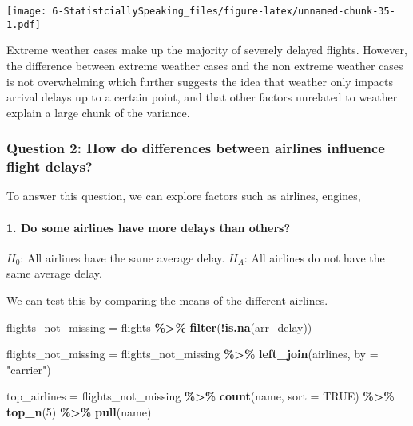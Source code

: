 \documentclass[
]{article}
\newenvironment{Shaded}{\begin{snugshade}}{\end{snugshade}}
\newcommand{\AttributeTok}[1]{\textcolor[rgb]{0.13,0.29,0.53}{#1}}
\newcommand{\ConstantTok}[1]{\textcolor[rgb]{0.56,0.35,0.01}{#1}}
\newcommand{\DecValTok}[1]{\textcolor[rgb]{0.00,0.00,0.81}{#1}}
\newcommand{\FunctionTok}[1]{\textcolor[rgb]{0.13,0.29,0.53}{\textbf{#1}}}
\newcommand{\NormalTok}[1]{#1}
\newcommand{\OtherTok}[1]{\textcolor[rgb]{0.56,0.35,0.01}{#1}}
\newcommand{\SpecialCharTok}[1]{\textcolor[rgb]{0.81,0.36,0.00}{\textbf{#1}}}
\newcommand{\StringTok}[1]{\textcolor[rgb]{0.31,0.60,0.02}{#1}}
\begin{document}
\texttt{[image: 6-StatistciallySpeaking\_files/figure-latex/unnamed-chunk-35-1.pdf]}

Extreme weather cases make up the majority of severely delayed flights.
However, the difference between extreme weather cases and the non
extreme weather cases is not overwhelming which further suggests the
idea that weather only impacts arrival delays up to a certain point, and
that other factors unrelated to weather explain a large chunk of the
variance.

\subsubsection{Question 2: How do differences between airlines influence
flight
delays?}\label{question-2-how-do-differences-between-airlines-influence-flight-delays}

To answer this question, we can explore factors such as airlines,
engines,

\paragraph{1. Do some airlines have more delays than
others?}\label{do-some-airlines-have-more-delays-than-others}

\(H_0\): All airlines have the same average delay. \(H_A\): All airlines
do not have the same average delay.

We can test this by comparing the means of the different airlines.

\begin{Shaded}
\begin{Highlighting}[]
\NormalTok{flights\_not\_missing }\OtherTok{=}\NormalTok{ flights }\SpecialCharTok{\%\textgreater{}\%}
  \FunctionTok{filter}\NormalTok{(}\SpecialCharTok{!}\FunctionTok{is.na}\NormalTok{(arr\_delay))}

\NormalTok{flights\_not\_missing }\OtherTok{=}\NormalTok{ flights\_not\_missing }\SpecialCharTok{\%\textgreater{}\%}
  \FunctionTok{left\_join}\NormalTok{(airlines, }\AttributeTok{by =} \StringTok{"carrier"}\NormalTok{)}

\NormalTok{top\_airlines }\OtherTok{=}\NormalTok{ flights\_not\_missing }\SpecialCharTok{\%\textgreater{}\%}
  \FunctionTok{count}\NormalTok{(name, }\AttributeTok{sort =} \ConstantTok{TRUE}\NormalTok{) }\SpecialCharTok{\%\textgreater{}\%}
  \FunctionTok{top\_n}\NormalTok{(}\DecValTok{5}\NormalTok{) }\SpecialCharTok{\%\textgreater{}\%}
  \FunctionTok{pull}\NormalTok{(name)}
\end{Highlighting}
\end{Shaded}
\end{document}

